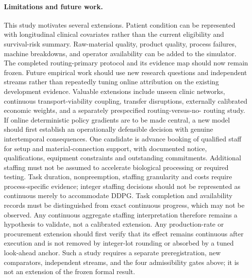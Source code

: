 \documentclass[preprint,review,12pt]{elsarticle}
\begin{document}
\paragraph{Limitations and future work.}
This study motivates several extensions. Patient condition can be represented
with longitudinal clinical covariates rather than the current eligibility and
survival-risk summary. Raw-material quality, product quality, process failures,
machine breakdowns, and operator availability can be added to the simulator.
The completed routing-primary protocol and its evidence map should now remain
frozen. Future empirical work should use new research questions and independent
streams rather than repeatedly tuning online attribution on the existing
development evidence. Valuable extensions include unseen clinic networks,
continuous transport-viability coupling, transfer disruptions, externally
calibrated economic weights, and a separately prespecified routing-versus-no-
routing study. If online deterministic policy gradients are to be made central,
a new model should first establish an operationally defensible decision with
genuine intertemporal consequences. One candidate is advance booking of
qualified staff for setup and material-connection support, with documented
notice, qualifications, equipment constraints and outstanding commitments.
Additional staffing must not be assumed to accelerate biological processing or
required testing. Task duration, nonpreemption, staffing granularity and costs
require process-specific evidence; integer staffing decisions should not be
represented as continuous merely to accommodate DDPG. Task completion and
availability records must be distinguished from exact continuous progress,
which may not be observed. Any continuous aggregate staffing interpretation
therefore remains a hypothesis to validate, not a calibrated extension.
Any production-rate or procurement extension should first verify that its
effect remains continuous after execution and is not removed by integer-lot
rounding or absorbed by a tuned look-ahead anchor. Such a study requires a
separate preregistration, new comparators, independent streams, and the four
admissibility gates above; it is not an extension of the frozen formal result.
\end{document}

